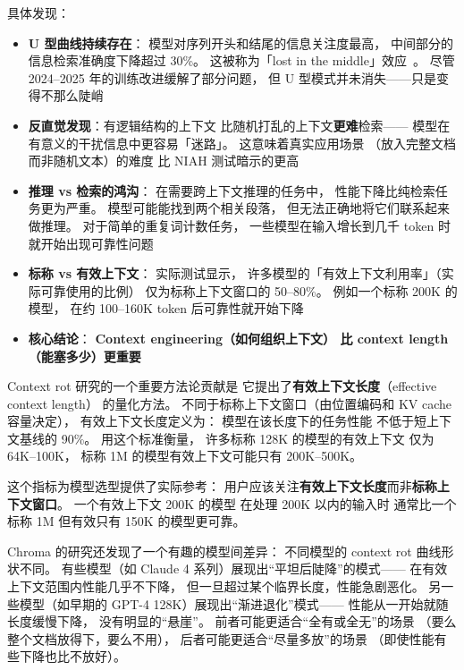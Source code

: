 具体发现：
\begin{itemize}[noitemsep]
  \item \textbf{U 型曲线持续存在}：
        模型对序列开头和结尾的信息关注度最高，
        中间部分的信息检索准确度下降超过 30\%。
        这被称为「lost in the middle」效应~\cite{liu2023lost}。
        尽管 2024--2025 年的训练改进缓解了部分问题，
        但 U 型模式并未消失——只是变得不那么陡峭
  \item \textbf{反直觉发现}：有逻辑结构的上下文
        比随机打乱的上下文\textbf{更难}检索——
        模型在有意义的干扰信息中更容易「迷路」。
        这意味着真实应用场景
        （放入完整文档而非随机文本）的难度
        比 NIAH 测试暗示的更高
  \item \textbf{推理 vs 检索的鸿沟}：
        在需要跨上下文推理的任务中，
        性能下降比纯检索任务更为严重。
        模型可能能找到两个相关段落，
        但无法正确地将它们联系起来做推理。
        对于简单的重复词计数任务，
        一些模型在输入增长到几千 token 时
        就开始出现可靠性问题
  \item \textbf{标称 vs 有效上下文}：
        实际测试显示，
        许多模型的「有效上下文利用率」（实际可靠使用的比例）
        仅为标称上下文窗口的 50--80\%。
        例如一个标称 200K 的模型，
        在约 100--160K token 后可靠性就开始下降
  \item \textbf{核心结论}：
        \textbf{Context engineering（如何组织上下文）
        比 context length（能塞多少）更重要}
\end{itemize}

Context rot 研究的一个重要方法论贡献是
它提出了\textbf{有效上下文长度}（effective context length）
的量化方法。
不同于标称上下文窗口（由位置编码和 KV cache 容量决定），
有效上下文长度定义为：
模型在该长度下的任务性能
不低于短上下文基线的 90\%。
用这个标准衡量，
许多标称 128K 的模型的有效上下文
仅为 64K--100K，
标称 1M 的模型有效上下文可能只有 200K--500K。

这个指标为模型选型提供了实际参考：
用户应该关注\textbf{有效上下文长度}而非\textbf{标称上下文窗口}。
一个有效上下文 200K 的模型
在处理 200K 以内的输入时
通常比一个标称 1M 但有效只有 150K 的模型更可靠。

Chroma 的研究还发现了一个有趣的模型间差异：
不同模型的 context rot 曲线形状不同。
有些模型（如 Claude 4 系列）展现出“平坦后陡降”的模式——
在有效上下文范围内性能几乎不下降，
但一旦超过某个临界长度，性能急剧恶化。
另一些模型（如早期的 GPT-4 128K）展现出“渐进退化”模式——
性能从一开始就随长度缓慢下降，
没有明显的“悬崖”。
前者可能更适合“全有或全无”的场景
（要么整个文档放得下，要么不用），
后者可能更适合“尽量多放”的场景
（即使性能有些下降也比不放好）。

